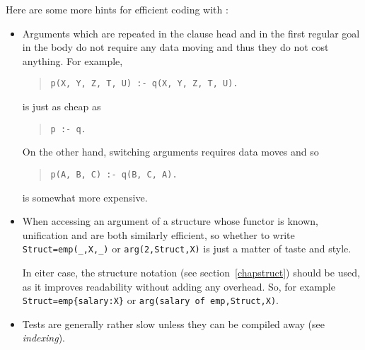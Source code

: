 Here are some more hints for efficient coding with {\eclipse}:
\begin{itemize}

\item Arguments which are repeated in the clause head and in the first
regular goal in the body do not require any data moving and thus
they do not cost anything. For example,
\begin{quote}
\begin{verbatim}
p(X, Y, Z, T, U) :- q(X, Y, Z, T, U).
\end{verbatim}
\end{quote}
is just as cheap as
\begin{quote}
\begin{verbatim}
p :- q.
\end{verbatim}
\end{quote}
On the other hand, switching arguments requires data moves and so
\begin{quote}
\begin{verbatim}
p(A, B, C) :- q(B, C, A).
\end{verbatim}
\end{quote}
is somewhat more expensive.

\item When accessing an argument of a
structure whose functor is known, unification and 
 are both similarly
efficient, so whether to write {\tt Struct=emp(_,X,_)} or 
{\tt arg(2,Struct,X)} is just a matter of taste and style.

In eiter case, the structure notation (see section~\ref{chapstruct})
should be used, as it improves readability without adding any overhead.
So, for example {\tt Struct=emp\{salary:X\}} or
{\tt arg(salary of emp,Struct,X)}.

\item Tests are generally rather slow unless they can be compiled away
(see {\it indexing}).



\end{itemize}
